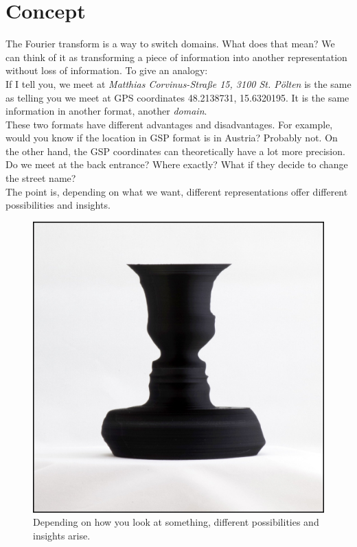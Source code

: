 \section{Concept}
The Fourier transform is a way to switch domains. What does that mean? We can think of it as transforming a piece of information into another representation without loss of information. To give an analogy: \\
If I tell you, we meet at \textit{Matthias Corvinus-Straße 15, 3100 St. Pölten} is the same as telling you we meet at GPS coordinates 48.2138731, 15.6320195. It is the same information in another format, another \textit{domain}.\\
These two formats have different advantages and disadvantages. For example, would you know if the location in GSP format is in Austria? Probably not. On the other hand, the GSP coordinates can theoretically have a lot more precision. Do we meet at the back entrance? Where exactly? What if they decide to change the street name? \\
The point is, depending on what we want, different representations offer different possibilities and insights.
\begin{figure}[H]
	\centering
	\includegraphics[width=\textwidth]{img/vase.jpg}
	\caption[illusion]
	{Depending on how you look at something, different possibilities and insights arise.}
	\label{fig:vase}
\end{figure}


